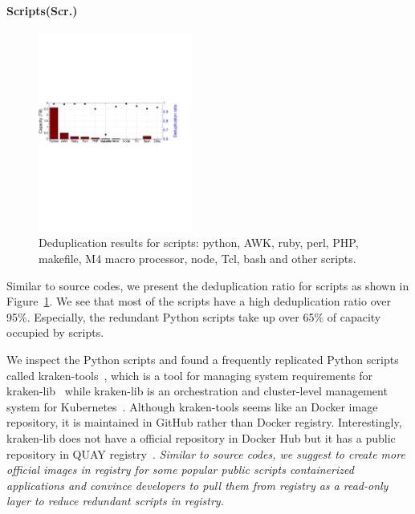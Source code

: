 \paragraph{Scripts(Scr.)}
%
%

\begin{figure} \centering
\includegraphics[width=0.45\textwidth]{graphs/dedup-scrp}
\caption{Deduplication results for scripts: python, AWK, ruby, perl, PHP,
makefile, M4 macro processor, node, Tcl, bash and other scripts.  }
\label{fig:dedup-scrp} \end{figure}

Similar to source codes, we present the deduplication ratio for scripts as
shown in Figure~\ref{fig:dedup-scrp}.  We see that most of the scripts have a
high deduplication ratio over 95\%. Especially, the redundant Python scripts
take up over 65\% of capacity occupied by scripts. 

We inspect the Python scripts and found a frequently replicated Python scripts
called kraken-tools~\cite{krakentools}, which is a tool for managing system
requirements for kraken-lib~\cite{krakenlib} while kraken-lib is an orchestration and
cluster-level management system for Kubernetes~\cite{kubernetes}.
Although kraken-tools seems like an Docker image repository, it is maintained
in GitHub rather than Docker registry. Interestingly, kraken-lib does not have
a official repository in Docker Hub but it has a public repository in QUAY
registry~\cite{quay}.  \textit{Similar to source codes, we suggest to create
more official images in registry for some popular public scripts %
containerized applications and convince developers to pull them from registry
as a read-only layer to reduce redundant scripts in registry.}

